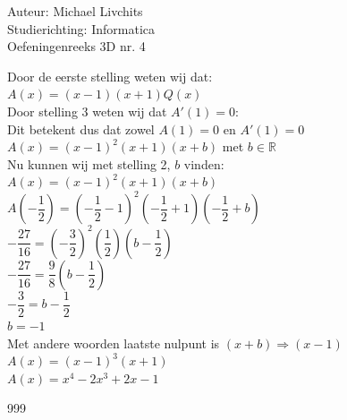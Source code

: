 \documentclass[a4paper]{article}
\begin{document}
  
\noindent \large Auteur: Michael Livchits \\
\noindent \large Studierichting: Informatica\\
\noindent \large Oefeningenreeks 3D nr. 4\\

\medskip

\normalsize

Door de eerste stelling weten wij dat:\\

$A(x) = (x-1)(x+1)Q(x)$\\

Door stelling 3 weten wij dat $A'(1) = 0$:\\

Dit betekent dus dat zowel $A(1) = 0$ en $A'(1) = 0$\\

$A(x) = (x-1)^2(x+1)(x+b)$ met $b \in \mathbb{R}$\\

Nu kunnen wij met stelling 2, $b$ vinden:\\

$A(x)=(x-1)^2(x+1)(x+b)$\\

$A\left(-\dfrac{1}{2}\right)=\left(-\dfrac{1}{2}-1\right)^2\left(-\dfrac{1}{2}+1\right)\left(-\dfrac{1}{2}+b\right)$\\

$-\dfrac{27}{16} = \left(-\dfrac{3}{2}\right)^2\left(\dfrac{1}{2}\right)\left(b-\dfrac{1}{2}\right)$\\

$-\dfrac{27}{16} = \dfrac{9}{8}\left(b-\dfrac{1}{2}\right)$\\

$-\dfrac{3}{2} = b-\dfrac{1}{2}$\\

$b=-1$\\

Met andere woorden laatste nulpunt is $(x+b) \Rightarrow (x-1)$\\

$A(x) = (x-1)^3(x+1)$\\

$A(x) = x^4-2x^3+2x-1$\\

\begin{thebibliography}{999}
\end{thebibliography}
\end{document}

